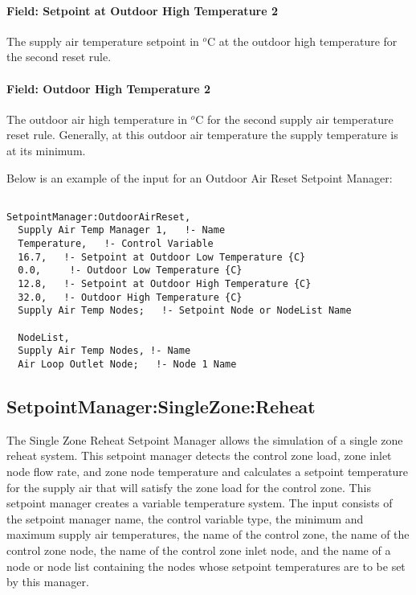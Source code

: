 \paragraph{Field: Setpoint at Outdoor High Temperature 2}\label{field-setpoint-at-outdoor-high-temperature-2}

The supply air temperature setpoint in \(^{o}\)C at the outdoor high temperature for the second reset rule.

\paragraph{Field: Outdoor High Temperature 2}\label{field-outdoor-high-temperature-2}

The outdoor air high temperature in \(^{o}\)C for the second supply air temperature reset rule. Generally, at this outdoor air temperature the supply temperature is at its minimum.

Below is an example of the input for an Outdoor Air Reset Setpoint Manager:

\begin{lstlisting}

SetpointManager:OutdoorAirReset,
  Supply Air Temp Manager 1,   !- Name
  Temperature,   !- Control Variable
  16.7,   !- Setpoint at Outdoor Low Temperature {C}
  0.0,     !- Outdoor Low Temperature {C}
  12.8,   !- Setpoint at Outdoor High Temperature {C}
  32.0,   !- Outdoor High Temperature {C}
  Supply Air Temp Nodes;   !- Setpoint Node or NodeList Name

  NodeList,
  Supply Air Temp Nodes, !- Name
  Air Loop Outlet Node;   !- Node 1 Name
\end{lstlisting}

\subsection{SetpointManager:SingleZone:Reheat}\label{setpointmanagersinglezonereheat}

The Single Zone Reheat Setpoint Manager allows the simulation of a single zone reheat system. This setpoint manager detects the control zone load, zone inlet node flow rate, and zone node temperature and calculates a setpoint temperature for the supply air that will satisfy the zone load for the control zone. This setpoint manager creates a variable temperature system. The input consists of the setpoint manager name, the control variable type, the minimum and maximum supply air temperatures, the name of the control zone, the name of the control zone node, the name of the control zone inlet node, and the name of a node or node list containing the nodes whose setpoint temperatures are to be set by this manager.

